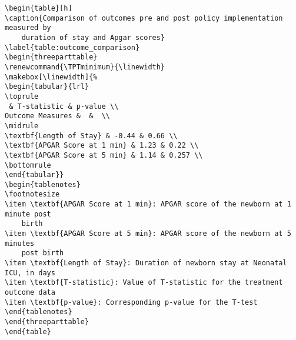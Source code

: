 \documentclass[11pt]{article}
\begin{document}
\begin{Verbatim}[tabsize=4]
\begin{table}[h]
\caption{Comparison of outcomes pre and post policy implementation measured by
	duration of stay and Apgar scores}
\label{table:outcome_comparison}
\begin{threeparttable}
\renewcommand{\TPTminimum}{\linewidth}
\makebox[\linewidth]{%
\begin{tabular}{lrl}
\toprule
 & T-statistic & p-value \\
Outcome Measures &  &  \\
\midrule
\textbf{Length of Stay} & -0.44 & 0.66 \\
\textbf{APGAR Score at 1 min} & 1.23 & 0.22 \\
\textbf{APGAR Score at 5 min} & 1.14 & 0.257 \\
\bottomrule
\end{tabular}}
\begin{tablenotes}
\footnotesize
\item \textbf{APGAR Score at 1 min}: APGAR score of the newborn at 1 minute post
	birth
\item \textbf{APGAR Score at 5 min}: APGAR score of the newborn at 5 minutes
	post birth
\item \textbf{Length of Stay}: Duration of newborn stay at Neonatal ICU, in days
\item \textbf{T-statistic}: Value of T-statistic for the treatment outcome data
\item \textbf{p-value}: Corresponding p-value for the T-test
\end{tablenotes}
\end{threeparttable}
\end{table}

\end{Verbatim}




\end{document}
